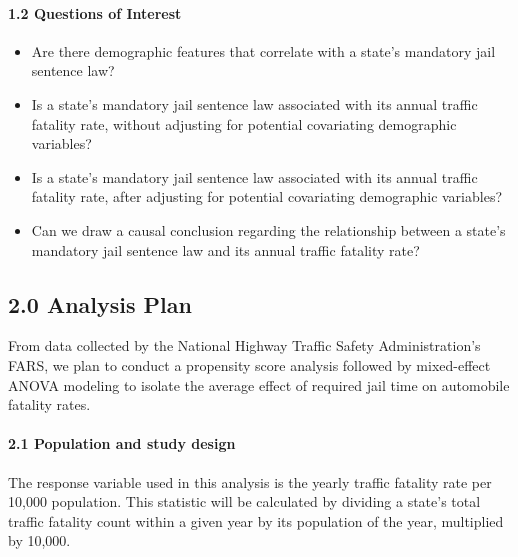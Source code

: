 \documentclass[]{article}
\providecommand{\tightlist}{%
  \setlength{\itemsep}{0pt}\setlength{\parskip}{0pt}}
\let\oldparagraph\paragraph
\renewcommand{\paragraph}[1]{\oldparagraph{#1}\mbox{}}
\begin{document}
\hypertarget{questions-of-interest}{%
\paragraph{1.2 Questions of Interest}\label{questions-of-interest}}

\begin{itemize}
\tightlist
\item
  Are there demographic features that correlate with a state's mandatory
  jail sentence law?\\
\item
  Is a state's mandatory jail sentence law associated with its annual
  traffic fatality rate, without adjusting for potential covariating
  demographic variables?\\
\item
  Is a state's mandatory jail sentence law associated with its annual
  traffic fatality rate, after adjusting for potential covariating
  demographic variables?\\
\item
  Can we draw a causal conclusion regarding the relationship between a
  state's mandatory jail sentence law and its annual traffic fatality
  rate?
\end{itemize}

\hypertarget{analysis-plan}{%
\subsection{2.0 Analysis Plan}\label{analysis-plan}}

From data collected by the National Highway Traffic Safety
Administration's FARS, we plan to conduct a propensity score analysis
followed by mixed-effect ANOVA modeling to isolate the average effect of
required jail time on automobile fatality rates.

\hypertarget{population-and-study-design}{%
\paragraph{2.1 Population and study
design}\label{population-and-study-design}}

The response variable used in this analysis is the yearly traffic
fatality rate per 10,000 population. This statistic will be calculated
by dividing a state's total traffic fatality count within a given year
by its population of the year, multiplied by 10,000.
\end{document}
